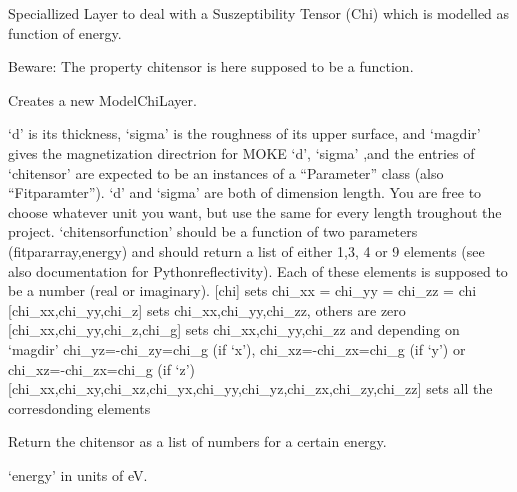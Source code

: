 \documentclass[letterpaper,10pt,english]{sphinxmanual}
\begin{document}
\begin{fulllineitems}
\label{\detokenize{modules-api/samplerepresentation:SampleRepresentation.ModelChiLayerObject}}
Speciallized Layer to deal with a Suszeptibility Tensor (Chi) which is modelled as function of energy.

Beware: The property chitensor is here supposed to be a function.

\begin{fulllineitems}
\label{\detokenize{modules-api/samplerepresentation:SampleRepresentation.ModelChiLayerObject.__init__}}
Creates a new ModelChiLayer.

‘d’ is its thickness, ‘sigma’ is the roughness of its upper surface,  and ‘magdir’ gives the magnetization directrion for MOKE
‘d’, ‘sigma’ ,and the entries of ‘chitensor’ are expected to be an instances of a “Parameter” class (also “Fitparamter”).
‘d’ and ‘sigma’ are both of dimension length. You are free to choose whatever unit you want, but use the same for every length troughout the project.
‘chitensorfunction’ should be a function of two parameters (fitpararray,energy) and should return a list of either  1,3, 4 or 9 elements (see also documentation for Pythonreflectivity). 
Each of these elements is supposed to be a number (real or imaginary).
{[}chi{]} sets chi\_xx = chi\_yy = chi\_zz = chi
{[}chi\_xx,chi\_yy,chi\_z{]} sets  chi\_xx,chi\_yy,chi\_zz, others are zero
{[}chi\_xx,chi\_yy,chi\_z,chi\_g{]} sets  chi\_xx,chi\_yy,chi\_zz and depending on ‘magdir’ chi\_yz=-chi\_zy=chi\_g (if ‘x’), chi\_xz=-chi\_zx=chi\_g (if ‘y’) or chi\_xz=-chi\_zx=chi\_g (if ‘z’)
{[}chi\_xx,chi\_xy,chi\_xz,chi\_yx,chi\_yy,chi\_yz,chi\_zx,chi\_zy,chi\_zz{]} sets all the corresdonding elements

\end{fulllineitems}


\begin{fulllineitems}
\label{\detokenize{modules-api/samplerepresentation:SampleRepresentation.ModelChiLayerObject.getChi}}
Return the chitensor as a list of numbers for a certain energy.

‘energy’ in units of eV.

\end{fulllineitems}


\end{fulllineitems}
\end{document}
